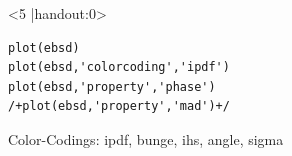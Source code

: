 \begin{frame}[fragile]
\begin{columns}
\begin{column}{8.5cm}
\begin{onlyenv}<5 |handout:0>
\begin{lstlisting}
plot(ebsd)
plot(ebsd,'colorcoding','ipdf')
plot(ebsd,'property','phase')
/+plot(ebsd,'property','mad')+/
\end{lstlisting}
\end{onlyenv}

      Color-Codings: ipdf, bunge, ihs, angle, sigma

    \end{column}

    \begin{column}{3.5cm}

\end{column}
\end{columns}
\end{frame}
